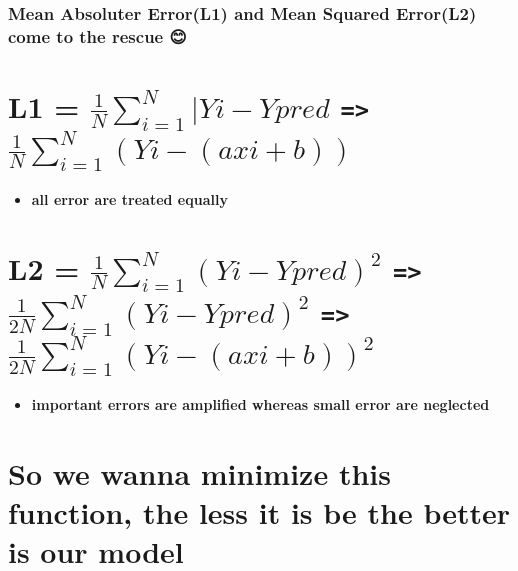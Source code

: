 \documentclass[11pt]{article}
\providecommand{\tightlist}{%
      \setlength{\itemsep}{0pt}\setlength{\parskip}{0pt}}
\begin{document}
    \subsubsection{\texorpdfstring{\textbf{Mean Absoluter Error(L1)} and
\textbf{Mean Squared Error(L2)} come to the rescue
😊}{Mean Absoluter Error(L1) and Mean Squared Error(L2) come to the rescue 😊}}\label{mean-absoluter-errorl1-and-mean-squared-errorl2-come-to-the-rescue}

    \section{\texorpdfstring{L1 =
\(\frac{1}{N} \sum_{i=1}^N|Yi-Ypred\)\textbar{} \texttt{=\textgreater{}}
\(\frac{1}{N} \sum_{i=1}^N(Yi-(axi+b))\)}{L1 = \textbackslash{}frac\{1\}\{N\} \textbackslash{}sum\_\{i=1\}\^{}N\textbar{}Yi-Ypred\textbar{} =\textgreater{} \textbackslash{}frac\{1\}\{N\} \textbackslash{}sum\_\{i=1\}\^{}N(Yi-(axi+b))}}\label{l1-frac1n-sum_i1nyi-ypred-frac1n-sum_i1nyi-axib}

    \begin{itemize}
\tightlist
\item
  \textbf{all error are treated equally}
\end{itemize}

    \section{\texorpdfstring{L2 = \(\frac{1}{N} \sum_{i=1}^N(Yi-Ypred)^2\)
\texttt{=\textgreater{}} \(\frac{1}{2N} \sum_{i=1}^N(Yi-Ypred)^2\)
\texttt{=\textgreater{}}
\(\frac{1}{2N} \sum_{i=1}^N(Yi-(axi+b))^2\)}{L2 = \textbackslash{}frac\{1\}\{N\} \textbackslash{}sum\_\{i=1\}\^{}N(Yi-Ypred)\^{}2 =\textgreater{} \textbackslash{}frac\{1\}\{2N\} \textbackslash{}sum\_\{i=1\}\^{}N(Yi-Ypred)\^{}2 =\textgreater{} \textbackslash{}frac\{1\}\{2N\} \textbackslash{}sum\_\{i=1\}\^{}N(Yi-(axi+b))\^{}2}}\label{l2-frac1n-sum_i1nyi-ypred2-frac12n-sum_i1nyi-ypred2-frac12n-sum_i1nyi-axib2}

    \begin{itemize}
\tightlist
\item
  \textbf{important errors are amplified whereas small error are
  neglected}
\end{itemize}

    \section{So we wanna minimize this function, the less it is be the
better is our
model}\label{so-we-wanna-minimize-this-function-the-less-it-is-be-the-better-is-our-model}
\end{document}
